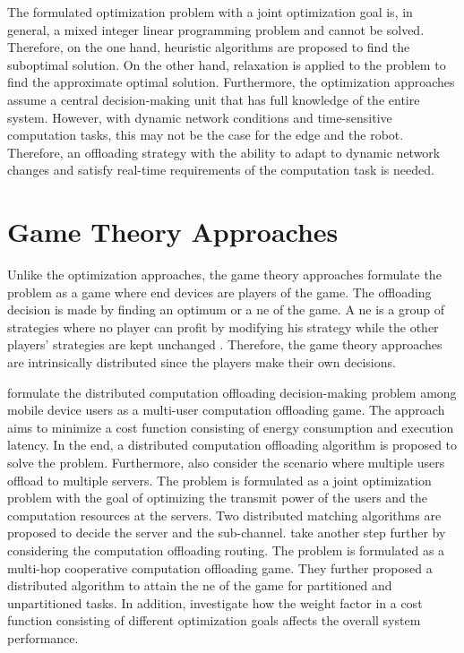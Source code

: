 The formulated optimization problem with a joint optimization goal is, in general, a mixed integer linear programming problem and cannot be solved. Therefore, on the one hand, heuristic algorithms are proposed to find the suboptimal solution. On the other hand, relaxation is applied to the problem to find the approximate optimal solution. Furthermore, the optimization approaches assume a central decision-making unit that has full knowledge of the entire system. However, with dynamic network conditions and time-sensitive computation tasks, this may not be the case for the edge and the robot. Therefore, an offloading strategy with the ability to adapt to dynamic network changes and satisfy real-time requirements of the computation task is needed. 

\section{Game Theory Approaches}

Unlike the optimization approaches, the game theory approaches formulate the problem as a game where end devices are players of the game. The offloading decision is made by finding an optimum or a \gls{ne} of the game. A \gls{ne} is a group of strategies where no player can profit by modifying his strategy while the other players’ strategies are kept unchanged \cite{Chaari2022}. Therefore, the game theory approaches are intrinsically distributed since the players make their own decisions. 

\citeauthor*{Chen2016} \cite{Chen2016} formulate the distributed computation offloading decision-making problem among mobile device users as a multi-user computation offloading game. The approach aims to minimize a cost function consisting of energy consumption and execution latency. In the end, a distributed computation offloading algorithm is proposed to solve the problem. Furthermore, \citeauthor*{Pham2018} \cite{Pham2018} also consider the scenario where multiple users offload to multiple servers. The problem is formulated as a joint optimization problem with the goal of optimizing the transmit power of the users and the computation resources at the servers. Two distributed matching algorithms are proposed to decide the server and the sub-channel. \citeauthor*{Hong2019} \cite{Hong2019} take another step further by considering the computation offloading routing. The problem is formulated as a multi-hop cooperative computation offloading game. They further proposed a distributed algorithm to attain the \gls{ne} of the game for partitioned and unpartitioned tasks. In addition, \citeauthor*{Xu2020} \cite{Xu2020} investigate how the weight factor in a cost function consisting of different optimization goals affects the overall system performance. 

